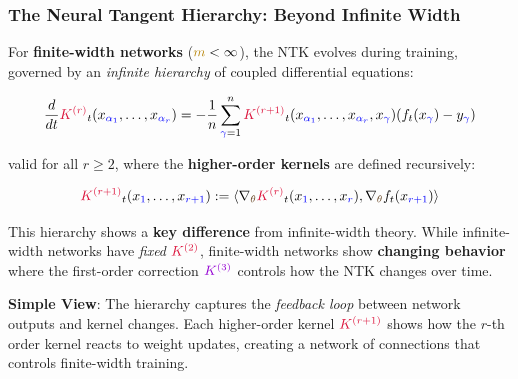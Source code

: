 \documentclass[a4paper]{article}
\theoremstyle{plain}
\theoremstyle{definition}
\theoremstyle{remark}
\newcommand{\K}{\textcolor{kernelcolor}{K}}
\begin{document}
\subsubsection{The Neural Tangent Hierarchy: Beyond Infinite Width}

\begin{tcolorbox}[colback=purple!5,colframe=purple!50!black,title={\textbf{Neural Tangent Hierarchy (NTH)}},enhanced,drop shadow]
For \textbf{finite-width networks} ($\textcolor{darkyellow}{m} < \infty$), the NTK evolves during training, governed by an \textit{infinite hierarchy} of coupled differential equations:

\begin{equation}
\label{eq:nth_hierarchy}
\frac{d}{dt} \textcolor{kernelcolor}{\K^{(r)}}_t(x_{\textcolor{blue}{\alpha_1}}, \ldots, x_{\textcolor{blue}{\alpha_r}}) = -\frac{1}{n} \sum_{\textcolor{blue}{\gamma}=1}^n \textcolor{kernelcolor}{\K^{(r+1)}}_t(x_{\textcolor{blue}{\alpha_1}}, \ldots, x_{\textcolor{blue}{\alpha_r}}, x_{\textcolor{blue}{\gamma}}) (f_t(x_{\textcolor{blue}{\gamma}}) - y_{\textcolor{blue}{\gamma}})
\end{equation}

valid for all $r \geq 2$, where the \textbf{higher-order kernels} are defined recursively:

\begin{equation}
\label{eq:higher_order_definition}
\textcolor{kernelcolor}{\K^{(r+1)}}_t(x_{\textcolor{blue}{1}}, \ldots, x_{\textcolor{blue}{r+1}}) := \langle \nabla_{\textcolor{weightcolor}{\theta}} \textcolor{kernelcolor}{\K^{(r)}}_t(x_{\textcolor{blue}{1}}, \ldots, x_{\textcolor{blue}{r}}), \nabla_{\textcolor{weightcolor}{\theta}} f_t(x_{\textcolor{blue}{r+1}}) \rangle
\end{equation}
\end{tcolorbox}

This hierarchy shows a \textbf{key difference} from infinite-width theory. While infinite-width networks have \textit{fixed} 
$\textcolor{kernelcolor}{\K^{(2)}}$, finite-width networks show \textbf{changing behavior} where the first-order 
correction $\textcolor{k3color}{K^{(3)}}$ controls how the NTK changes over time.

\textbf{Simple View}: The hierarchy captures the \textit{feedback loop} between network outputs and kernel changes.
 Each higher-order kernel $\textcolor{kernelcolor}{\K^{(r+1)}}$ shows how the $r$-th order kernel reacts to weight updates,
  creating a network of connections that controls finite-width training.
\end{document}
